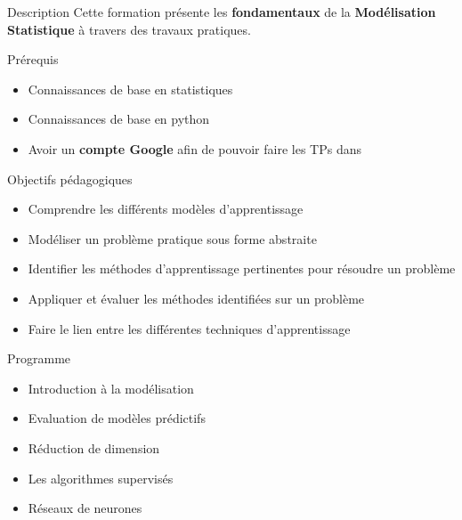 \begin{frame}{Description}
  Cette formation présente les \textbf{fondamentaux} de la \textbf{Modélisation Statistique} à travers des travaux pratiques.
\end{frame}

\begin{frame}{Prérequis}
  \begin{itemize}
  \item Connaissances de base en statistiques
  \item Connaissances de base en python
  \item Avoir un \textbf{compte Google} afin de pouvoir faire les TPs dans 
  \end{itemize}
\end{frame}

\begin{frame}{Objectifs pédagogiques}
  \begin{itemize}
  \item Comprendre les différents modèles d'apprentissage
  \item Modéliser un problème pratique sous forme abstraite
  \item Identifier les méthodes d'apprentissage pertinentes pour résoudre un problème
  \item Appliquer et évaluer les méthodes identifiées sur un problème
  \item Faire le lien entre les différentes techniques d'apprentissage
  \end{itemize}
\end{frame}

\begin{frame}{Programme}
  \begin{itemize}
  \item Introduction à la modélisation
  \item Evaluation de modèles prédictifs
  \item Réduction de dimension
  \item Les algorithmes supervisés
  \item Réseaux de neurones
  \end{itemize}
\end{frame}

